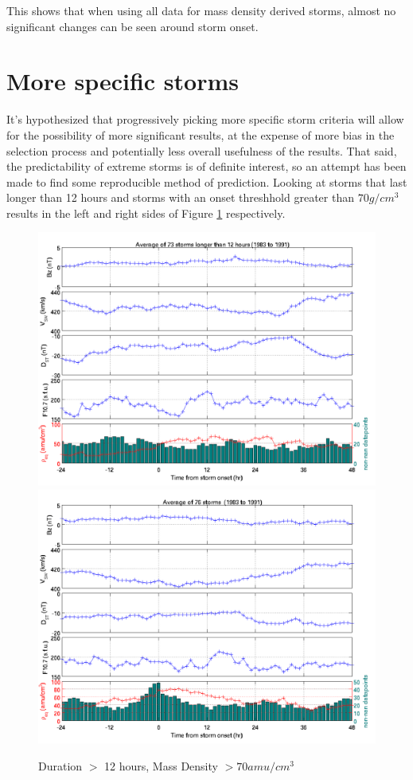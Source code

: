\documentclass[10pt,twocolumn]{article}
\begin{document}
This shows that when using all data for mass density derived storms, almost no significant changes can be seen around storm onset.



\section{More specific storms}
It's hypothesized that progressively picking more specific storm criteria will allow for the possibility of more significant results, at the expense of more bias in the selection process and potentially less overall usefulness of the results. That said, the predictability of extreme storms is of definite interest, so an attempt has been made to find some reproducible method of prediction. Looking at storms that last longer than 12 hours and storms with an onset threshhold greater than $70g/cm^3$ results in the left and right sides of Figure \ref{Mspec} respectively.

\begin{figure}[htp!]
\centering
\includegraphics[scale=0.35]{paperfigures/stormavs-md12.png}
\includegraphics[scale=0.35]{paperfigures/stormavs-m70.png}
\caption{Duration $>$ 12 hours, Mass Density $>70 amu/cm^3$}
\label{Mspec}
\end{figure}
\end{document}

